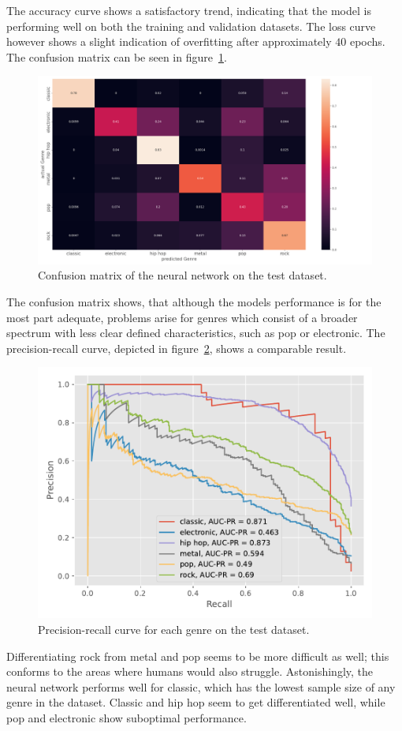 \documentclass[
  12pt,
  bibliography=totoc,     %
  captions=tableheading,  %
  titlepage=firstiscover, %
]{scrartcl}
\begin{document}
\FloatBarrier
\noindent
The accuracy curve shows a satisfactory trend, indicating that the model is performing well on both the training and validation datasets. The loss curve however
shows a slight indication of overfitting after approximately $40$ epochs.
The confusion matrix can be seen in figure~\ref{fig:nn_confusion}.
\begin{figure}[H]
  \centering
  \includegraphics[scale=0.33]{figures/NN/confusion_matrix_nn.png}
  \caption{Confusion matrix of the neural network on the test dataset.}
  \label{fig:nn_confusion}
\end{figure}
\noindent
The confusion matrix shows, that although the models performance is for the most part adequate, problems arise for genres which consist of a broader spectrum with less clear
defined characteristics, such as pop or electronic.
The precision-recall curve, depicted in figure~\ref{fig:pr_curve_nn}, shows a comparable result.
\begin{figure}[H]
  \centering
  \includegraphics[scale=0.7]{figures/NN/PR_curve_genres.pdf}
  \caption{Precision-recall curve for each genre on the test dataset.}
  \label{fig:pr_curve_nn}
\end{figure}
\noindent
Differentiating rock from metal and pop seems to be more difficult as well; this conforms to the areas where humans would
also struggle. Astonishingly, the neural network performs well for classic, which has the lowest sample size of any genre in the dataset.
Classic and hip hop seem to get differentiated well, while pop and electronic show suboptimal performance.
\end{document}
